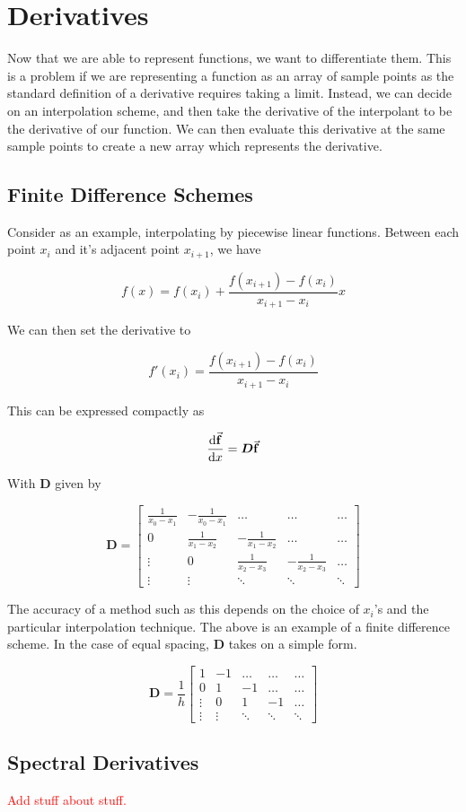 \documentclass[12pt,letterpaper]{article}
\numberwithin{equation}{section}
\newcommand{\beq}{\begin{equation}}
\newcommand{\eeq}{\end{equation}}
\begin{document}
\section{Derivatives}
Now that we are able to represent functions, we want to differentiate them. This is a problem if we are representing a function as an array of sample points as the standard definition of a derivative requires taking a limit. Instead, we can decide on an interpolation scheme, and then take the derivative of the interpolant to be the derivative of our function. We can then evaluate this derivative at the same sample points to create a new array which represents the derivative.

\subsection{Finite Difference Schemes}
Consider as an example, interpolating by piecewise linear functions. Between each point $x_i$ and it's adjacent point $x_{i+1}$, we have

\beq
f(x) = f(x_i) + \frac{f(x_{i+1}) - f(x_i)}{x_{i+1} - x_i}x
\eeq

\noindent We can then set the derivative to

\beq
f'(x_i) = \frac{f(x_{i+1}) - f(x_i)}{x_{i+1} - x_i}
\eeq

\noindent This can be expressed compactly as

\beq
\dv{\va{f}}{x} = \boldsymbol{D} \va{f}
\eeq

\noindent With $\boldsymbol{D}$ given by

\beq
\boldsymbol{D}
=
\begin{bmatrix}
	\frac{1}{x_0 - x_1} & -\frac{1}{x_0 - x_1} & \dots & \dots & \dots \\ 
	0 & \frac{1}{x_1 - x_2} & -\frac{1}{x_1 - x_2} & \dots & \dots \\
	\vdots & 0 & \frac{1}{x_2 - x_3} & -\frac{1}{x_2 - x_3} & \dots \\
	\vdots & \vdots & \ddots & \ddots & \ddots
\end{bmatrix}
\eeq

The accuracy of a method such as this depends on the choice of $x_i$'s and the particular interpolation technique. The above is an example of a finite difference scheme. In the case of equal spacing, $\boldsymbol{D}$ takes on a simple form.

\beq
\boldsymbol{D}
= \frac{1}{h}
\begin{bmatrix}
	1 & -1 & \dots & \dots & \dots \\ 
	0 & 1 & -1 & \dots & \dots \\
	\vdots & 0 & 1 & -1 & \dots \\
	\vdots & \vdots & \ddots & \ddots & \ddots
\end{bmatrix}
\eeq

\subsection{Spectral Derivatives}
\begin{center}
\textcolor{red}{Add stuff about stuff.}
\end{center}
\end{document}
